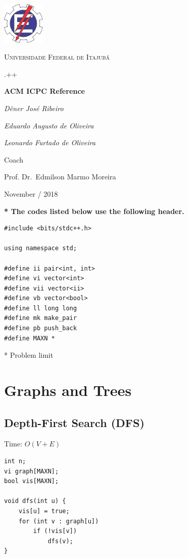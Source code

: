 \documentclass[oneside]{article}
\begin{document}
\begin{titlepage}
  \centering
  \includegraphics[width=0.15\textwidth]{logo.png}\par\vspace{1cm}
  {\scshape\LARGE Universidade Federal de Itajubá \par}
  \vspace{1cm}
  {\scshape\Large .++\par}
  \vspace{1.5cm}
  {\huge\bfseries ACM ICPC Reference\par}
  \vspace{2cm}
  {\Large\itshape Dêner José Ribeiro\par}
  {\Large\itshape Eduardo Augusto de Oliveira\par}
  {\Large\itshape Leonardo Furtado de Oliveira\par}
  \vfill
  Coach\par
  Prof. Dr.~Edmilson Marmo Moreira
  
  \vfill
  
  {\large November / 2018\par}
\end{titlepage}

\thispagestyle{empty}
\tableofcontents
\pagebreak

\textbf{* The codes listed below use the following header.}
\begin{lstlisting}
#include <bits/stdc++.h>

using namespace std;

#define ii pair<int, int>
#define vi vector<int>
#define vii vector<ii>
#define vb vector<bool>
#define ll long long
#define mk make_pair
#define pb push_back
#define MAXN *
\end{lstlisting}
* Problem limit

\section{Graphs and Trees}

\subsection{Depth-First Search (DFS)}
Time: $O(V + E)$
\begin{lstlisting}
int n;
vi graph[MAXN];
bool vis[MAXN];

void dfs(int u) {
    vis[u] = true;
    for (int v : graph[u])
    	if (!vis[v])
    		dfs(v);
}
\end{lstlisting}
\end{document}
